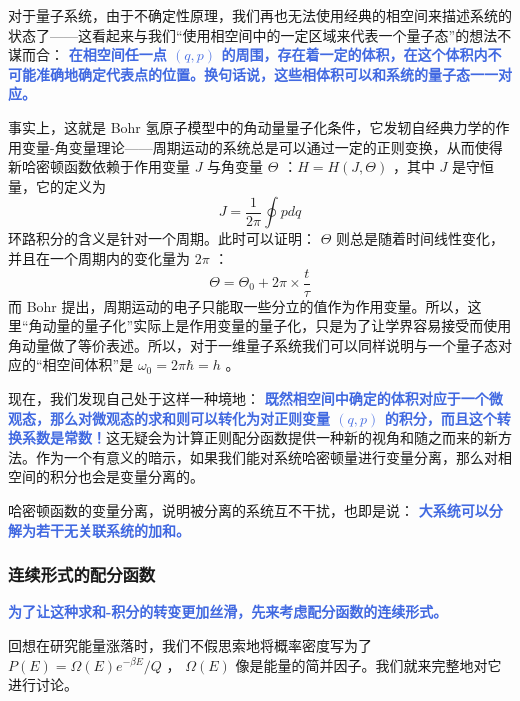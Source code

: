\documentclass[hyperref,UTF-8]{ctexart}
\newcommand{\0}{\boldsymbol{0}}
\begin{document}
对于量子系统，由于不确定性原理，我们再也无法使用经典的相空间来描述系统的状态了——这看起来与我们“使用相空间中的一定区域来代表一个量子态”的想法不谋而合： \textcolor{RoyalBlue}{\textbf{\kaishu  在相空间任一点 $(q,p)$ 的周围，存在着一定的体积，在这个体积内不可能准确地确定代表点的位置。换句话说，这些相体积可以和系统的量子态一一对应。}}

事实上，这就是 Bohr 氢原子模型中的角动量量子化条件，它发轫自经典力学的作用变量-角变量理论——周期运动的系统总是可以通过一定的正则变换，从而使得新哈密顿函数依赖于作用变量 $J$ 与角变量 $\Theta$ ：$H = H(J,\Theta)$ ，其中 $J$ 是守恒量，它的定义为
\[
    J = \frac{1}{2\pi} \oint pdq
\]
环路积分的含义是针对一个周期。此时可以证明： $\Theta$ 则总是随着时间线性变化，并且在一个周期内的变化量为 $2\pi$ ：
\[
    \Theta = \Theta_0 + 2\pi \times \frac{t}{\tau} 
\]
而 Bohr 提出，周期运动的电子只能取一些分立的值作为作用变量。所以，这里“角动量的量子化”实际上是作用变量的量子化，只是为了让学界容易接受而使用角动量做了等价表述。所以，对于一维量子系统我们可以同样说明与一个量子态对应的“相空间体积”是 $\omega_0 = 2\pi \hbar = h$ 。

现在，我们发现自己处于这样一种境地： \textcolor{RoyalBlue}{\textbf{\kaishu 既然相空间中确定的体积对应于一个微观态，那么对微观态的求和则可以转化为对正则变量 $(q,p)$ 的积分，而且这个转换系数是常数！}}这无疑会为计算正则配分函数提供一种新的视角和随之而来的新方法。作为一个有意义的暗示，如果我们能对系统哈密顿量进行变量分离，那么对相空间的积分也会是变量分离的。

哈密顿函数的变量分离，说明被分离的系统互不干扰，也即是说： \textcolor{RoyalBlue}{\textbf{\kaishu 大系统可以分解为若干无关联系统的加和。}} 

\subsubsection{连续形式的配分函数}
\textcolor{RoyalBlue}{\textbf{\kaishu 为了让这种求和-积分的转变更加丝滑，先来考虑配分函数的连续形式。}}

回想在研究能量涨落时，我们不假思索地将概率密度写为了 $P(E) = \Omega(E)e^{-\beta E}/Q$ ， $\Omega(E)$ 像是能量的简并因子。我们就来完整地对它进行讨论。
\end{document}
